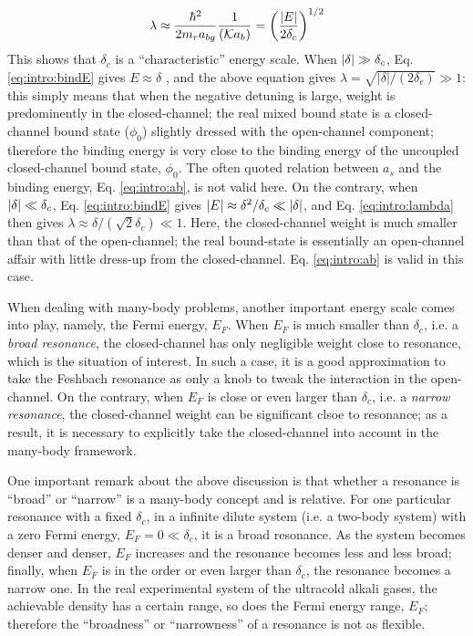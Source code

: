 \begin{equation}\label{eq:intro:lambda}
\lambda\approx\frac{\hbar^{2}}{2m_{r}a_{bg}}\frac{1}{(\mathcal{K}a_{b})}=\left(\frac{\left\lvert{E}\right\rvert}{2\delta_{c}}\right)^{1/2}
\end{equation}
This shows that  $\delta_{c}$ is a ``characteristic'' energy scale. When $\left\lvert{\delta}\right\rvert\gg\delta_{c}$, Eq. \ref{eq:intro:bindE} gives $E\approx\delta$ , and the above equation gives $\lambda=\sqrt{|\delta|/(2\delta_{c})}\gg1$: this simply means that when the negative detuning is large, weight is predominently in the closed-channel; the real mixed bound state is a closed-channel bound state ($\phi_{0}$) slightly dressed with the open-channel component; therefore the binding energy is very close to the binding energy  of the uncoupled closed-channel bound state, $\phi_{0}$.  The often quoted relation between $a_{s}$ and the binding energy, Eq. \ref{eq:intro:ab},  is not valid here.  On the contrary, when $\left\lvert{\delta}\right\rvert\ll\delta_{c}$, Eq. \ref{eq:intro:bindE}  gives $\left\lvert{E}\right\rvert\approx\delta^{2}/\delta_{c}\ll\left\lvert{\delta}\right\rvert$,  and Eq. \ref{eq:intro:lambda} then gives $\lambda\approx{\delta/(\sqrt{2}\delta_{c})}\ll1$.  Here, the closed-channel weight is much smaller than that of the open-channel; the real bound-state is essentially an open-channel affair with little dress-up from the closed-channel.  Eq. \ref{eq:intro:ab} is valid in this case. %

When dealing with  many-body problems, another important energy scale comes into play, namely, the Fermi energy, $E_{F}$.  When $E_{F}$ is much smaller than $\delta_{c}$, i.e. a \emph{broad resonance},  the closed-channel has only negligible weight close to resonance, which is the situation of interest. In such a case, it is a good approximation to take the Feshbach resonance as only a knob to tweak the interaction in the open-channel.  On the contrary, when $E_{F}$ is close or even larger than $\delta_{c}$, i.e. a \emph{narrow resonance}, the closed-channel weight can be  significant clsoe to  resonance; as a result, it is necessary to explicitly take the closed-channel into account in the many-body framework.  

One important remark about the above discussion is that whether a resonance is ``broad'' or ``narrow'' is a many-body concept and is relative.  For one particular resonance with a fixed $\delta_{c}$, in a infinite dilute system (i.e. a two-body system) with a zero Fermi energy,  $E_{F}=0\ll\delta_{c}$, it is a broad resonance.  As the system becomes denser and denser, $E_{F}$ increases and the resonance becomes less and less broad; finally, when $E_{F}$ is in the order or even larger than $\delta_{c}$, the resonance becomes a narrow one.  In the real experimental system of the ultracold alkali gases, the achievable density has a certain range, so does the Fermi energy range, $E_{F}$; therefore the ``broadness'' or ``narrowness'' of a resonance is not as flexible. 











